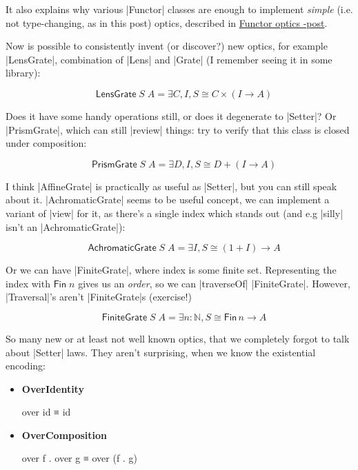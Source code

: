 \documentclass{article}
\begin{document}
It also explains why various |Functor| classes are enough to implement
\emph{simple} (i.e. not type-changing, as in this post) optics, described in
\href{2017-12-23-functor-optics.html}{Functor optics -post}.

Now is possible to consistently invent (or discover?) new optics,
for example |LensGrate|, combination of |Lens| and |Grate|
(I remember seeing it in some library):

\begin{equation}
  \quad \mathsf{LensGrate}\;S\;A = \exists C,I, S \cong C \times (I \to A)
\end{equation}

Does it have some handy operations still, or does it degenerate to |Setter|?
Or |PrismGrate|, which can still |review| things: try to verify that
this class is closed under composition:

\begin{equation}
  \quad \mathsf{PrismGrate}\;S\;A = \exists D,I, S \cong D + (I \to A)
\end{equation}

I think |AffineGrate| is practically as useful as |Setter|, but you can
still speak about it. |AchromaticGrate| seems to be useful
concept, we can implement a variant of |view| for it, as there's
a single index which stands out (and e.g |silly| isn't an |AchromaticGrate|):

\begin{equation}
  \quad \mathsf{AchromaticGrate}\;S\;A = \exists I, S \cong (1 + I) \to A
\end{equation}

Or we can have |FiniteGrate|, where index is some finite set.
Representing the index with $\mathsf{Fin}\;n$ gives us an \emph{order},
so we can |traverseOf| |FiniteGrate|. However, |Traversal|'s aren't
|FiniteGrate|s (exercise!)

\begin{equation}
  \quad \mathsf{FiniteGrate}\;S\;A = \exists n : \mathbb{N}, S \cong \mathsf{Fin}\,n \to A
\end{equation}

So many new or at least not well known optics, that we completely forgot
to talk about |Setter| laws. They aren't surprising, when we know
the existential encoding:

\begin{itemize}
\item \textbf{OverIdentity}
\begin{code}
over id ≡ id
\end{code}

\item \textbf{OverComposition}
\begin{code}
over f . over g ≡ over (f . g)
\end{code}
\end{itemize}
\end{document}
